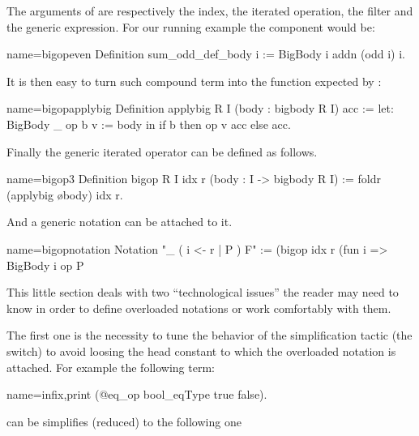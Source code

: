 The arguments of  are respectively the index, the
iterated operation, the filter and the generic expression.
For our running example the  component would be:

\begin{coq}{name=bigopeven}{}
Definition sum_odd_def_body i := BigBody i addn (odd i) i.
\end{coq}

It is then easy to turn such compound term into the function expected
by :

\begin{coq}{name=bigopapplybig}{}
Definition applybig {R I} (body : bigbody R I) acc :=
  let: BigBody _ op b v := body in if b then op v acc else acc.
\end{coq}

Finally the generic iterated operator can be defined as follows.

\begin{coq}{name=bigop3}{}
Definition bigop R I idx r (body : I -> bigbody R I) :=
  foldr (applybig \o body) idx r.
\end{coq}

And a generic notation can be attached to it.

\begin{coq}{name=bigopnotation}{}
Notation "\big [ op / idx ]_ ( i <- r | P ) F" :=
  (bigop idx r (fun i => BigBody i op P%
\end{coq}


This little section deals with two ``technological issues'' the reader
may need to know in order to define overloaded notations or work
comfortably with them.

The first one is the necessity to tune the behavior of the
simplification tactic (the \C{/=} switch) to avoid loosing the
head constant to which the overloaded notation is attached.
For example the following term:

\begin{coq}{name=infix,print}{}
  (@eq_op bool_eqType true false).
\end{coq}

can be simplifies (reduced) to the following one

